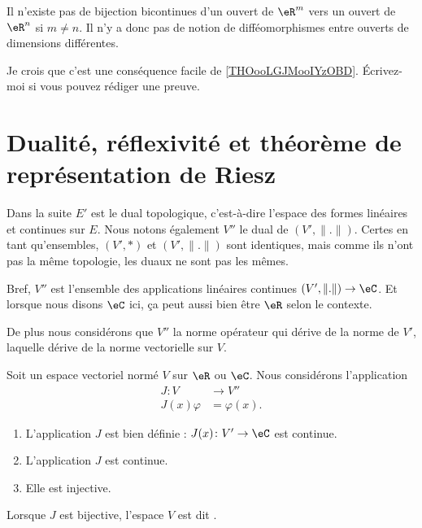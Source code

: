 \begin{remark}  %
	Il n'existe pas de bijection bicontinues d'un ouvert de \( \eR^m\) vers un ouvert de \( \eR^n\) si \( m\neq n\). Il n'y a donc pas de notion de difféomorphismes entre ouverts de dimensions différentes.

	Je crois que c'est une conséquence facile de \ref{THOooLGJMooIYzOBD}. Écrivez-moi si vous pouvez rédiger une preuve.
\end{remark}


\section{Dualité, réflexivité et théorème de représentation de Riesz}

Dans la suite \( E'\) est le dual topologique, c'est-à-dire l'espace des formes linéaires et continues sur \( E\). Nous notons également \( V''\) le dual de \( (V',\| . \|)\). Certes en tant qu'ensembles, \( (V',*)\) et \( (V',\| . \|) \) sont identiques, mais comme ils n'ont pas la même topologie, les duaux ne sont pas les mêmes.

Bref, \( V''\) est l'ensemble des applications linéaires continues \( (V',\| . \|)\to \eC\). Et lorsque nous disons \( \eC\) ici, ça peut aussi bien être \( \eR\) selon le contexte.

De plus nous considérons que \( V''\) la norme opérateur qui dérive de la norme de \( V'\), laquelle dérive de la norme vectorielle sur \( V\).

\begin{propositionDef}      \label{PROPooMAQSooCGFBBM}
	Soit un espace vectoriel normé \( V\) sur \( \eR\) ou \( \eC\). Nous considérons l'application
	\begin{equation}
		\begin{aligned}
			J\colon V   & \to V''       \\
			J(x)\varphi & = \varphi(x).
		\end{aligned}
	\end{equation}
	\begin{enumerate}
		\item       \label{ITEMooNVVSooNFXgnE}
		      L'application \( J\) est bien définie : \( J(x)\colon V'\to \eC\) est continue.
		\item       \label{ITEMooKURHooZZWpbu}
		      L'application \( J\) est continue.
		\item       \label{ITEMooTFYVooKhMOjp}
		      Elle est injective.
	\end{enumerate}

	Lorsque \( J\) est bijective, l'espace \( V\) est dit .
\end{propositionDef}

